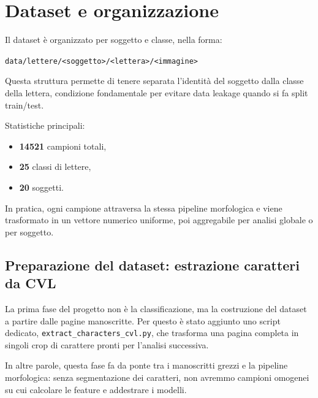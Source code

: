 \documentclass[a4paper,12pt]{article}
\begin{document}
\section{Dataset e organizzazione}
Il dataset è organizzato per soggetto e classe, nella forma:
\begin{center}
\texttt{data/lettere/<soggetto>/<lettera>/<immagine>}
\end{center}

Questa struttura permette di tenere separata l'identità del soggetto dalla classe della lettera, condizione fondamentale per evitare data leakage quando si fa split train/test.

Statistiche principali:
\begin{itemize}[leftmargin=1.5em]
  \item \textbf{14521} campioni totali,
  \item \textbf{25} classi di lettere,
  \item \textbf{20} soggetti.
\end{itemize}

In pratica, ogni campione attraversa la stessa pipeline morfologica e viene trasformato in un vettore numerico uniforme, poi aggregabile per analisi globale o per soggetto.

\subsection{Preparazione del dataset: estrazione caratteri da CVL}
La prima fase del progetto non è la classificazione, ma la costruzione del dataset a partire dalle pagine manoscritte.
Per questo è stato aggiunto uno script dedicato, \texttt{extract\_characters\_cvl.py}, che trasforma una pagina completa in singoli crop di carattere pronti per l'analisi successiva.

In altre parole, questa fase fa da ponte tra i manoscritti grezzi e la pipeline morfologica: senza segmentazione dei caratteri, non avremmo campioni omogenei su cui calcolare le feature e addestrare i modelli.
\end{document}
